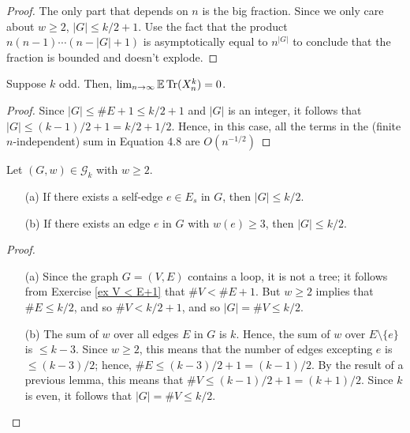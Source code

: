\begin{proof}
  \notready
  The only part that depends on $n$ is the big fraction. Since we only care about $w \ge 2$, $|G| \le k/2 + 1$. Use the fact that the product $n(n-1)\cdots (n-|G|+1)$ is asymptotically equal to $n^{|G|}$ to conclude that the fraction is bounded and doesn't explode.
\end{proof}



\begin{proposition}
  \label{prop:odd_case}
  \notready
  Suppose $k$ odd. Then, $\lim_{n\to\infty} {\mathbb{E}}\operatorname{Tr}(X_n^k) = 0$.
\end{proposition}

\begin{proof}
  \notready
  Since $|G|\le \#E+1 \le k/2+1$ and $|G|$ is an integer, it follows that $|G|\le (k-1)/2+1 = k/2 + 1/2$.  Hence, in this case, all the terms in the (finite $n$-independent) sum in Equation 4.8 are $O(n^{-1/2})$
\end{proof}



\begin{proposition}%
  \label{prop:g_bound}
  \notready
  Let $(G,w)\in\mathcal{G}_k$ with $w\ge 2$.
  \begin{itemize}
  \item[(a)] If there exists a self-edge $e\in E_s$ in $G$, then $|G|\le k/2$.
  \item[(b)] If there exists an edge $e$ in $G$ with $w(e)\ge 3$, then $|G|\le k/2$.
  \end{itemize}
\end{proposition}

\begin{proof}
  \notready
  \begin{itemize}
    \item[(a)] Since the graph $G = (V,E)$ contains a loop, it is not a tree; it follows from Exercise \ref{ex V < E+1} that $\#V < \#E+1$.  But $w\ge 2$ implies that $\#E\le k/2$, and so $\#V < k/2+1$, and so $|G| = \#V \le k/2$.

    \item[(b)] The sum of $w$ over all edges $E$ in $G$ is $k$.  Hence, the sum of $w$ over $E\setminus\{e\}$ is $\le k-3$.  Since $w\ge 2$, this means that the number of edges excepting $e$ is $\le (k-3)/2$; hence, $\#E \le (k-3)/2+1 = (k-1)/2$.  By the result of a previous lemma, this means that $\#V \le (k-1)/2+1 = (k+1)/2$.  Since $k$ is even, it follows that $|G|=\#V \le k/2$.
  \end{itemize}
\end{proof}




